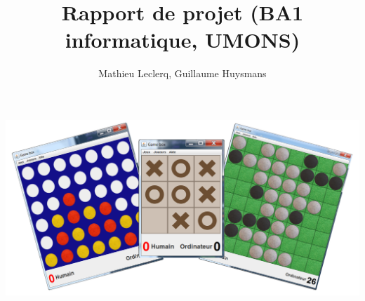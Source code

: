 \documentclass[12pt]{article}
\title{Rapport de projet (BA1 informatique, UMONS)}
\author{Mathieu Leclerq, Guillaume Huysmans}
\begin{document}
\maketitle
\includegraphics[width=\textwidth]{../cover.png}
\tableofcontents
\newpage










\end{document}
